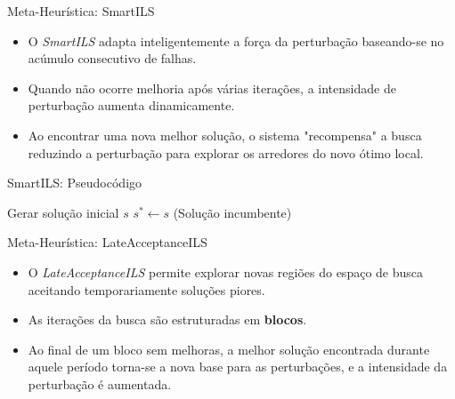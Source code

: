 \documentclass{beamer}
\begin{document}
\begin{frame}{Meta-Heurística: SmartILS}
    \begin{itemize}
        \item O \textit{SmartILS} adapta inteligentemente a força da perturbação baseando-se no acúmulo consecutivo de falhas.
        \item Quando não ocorre melhoria após várias iterações, a intensidade de perturbação aumenta dinamicamente.
        \item Ao encontrar uma nova melhor solução, o sistema "recompensa" a busca reduzindo a perturbação para explorar os arredores do novo ótimo local.
    \end{itemize}
\end{frame}

\begin{frame}[fragile]{SmartILS: Pseudocódigo}
    \begin{center}
    \scriptsize
        \begin{algorithm}[H]
        Gerar solução inicial $s$\;
        $s^* \leftarrow s$ (Solução incumbente)\;
        \end{algorithm}
    \end{center}
\end{frame}

\begin{frame}{Meta-Heurística: LateAcceptanceILS}
    \begin{itemize}
        \item O \textit{LateAcceptanceILS} permite explorar novas regiões do espaço de busca aceitando temporariamente soluções piores.
        \item As iterações da busca são estruturadas em \textbf{blocos}.
        \item Ao final de um bloco sem melhoras, a melhor solução encontrada durante aquele período torna-se a nova base para as perturbações, e a intensidade da perturbação é aumentada.
    \end{itemize}
\end{frame}
\end{document}
